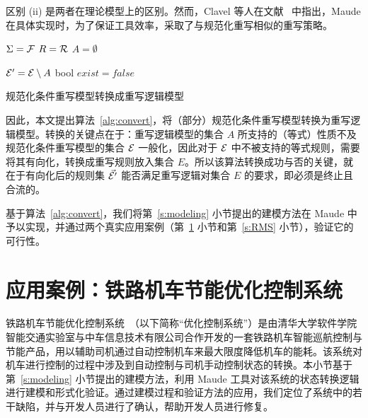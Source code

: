 区别 (ii) 是两者在理论模型上的区别。然而，Clavel 等人在文献~ 中指出，Maude 在具体实现时，为了保证工具效率，采取了与规范化重写相似的重写策略。

\begin{algorithm}[ht] 

    $\Sigma = \mathcal{F}$\;
    $R = \mathcal{R}$\;
    $A = \emptyset$\;


    $\mathcal{E}' = \mathcal{E} \setminus A$\;
    bool $exist = false$\;


     
\caption{规范化条件重写模型转换成重写逻辑模型}
\label{alg:convert}
\end{algorithm}

因此，本文提出算法~\ref{alg:convert}，将（部分）规范化条件重写模型转换为重写逻辑模型。转换的关键点在于：重写逻辑模型的集合 $A$ 所支持的（等式）性质不及规范化条件重写模型的集合 $\mathcal{E}$ 一般化，因此对于 $\mathcal{E}$ 中不被支持的等式规则，需要将其有向化，转换成重写规则放入集合 $E$。所以该算法转换成功与否的关键，就在于有向化后的规则集 $\vec{\mathcal{E}'}$ 能否满足重写逻辑对集合 $E$ 的要求，即必须是终止且合流的。

基于算法~\ref{alg:convert}，我们将第~\ref{s:modeling} 小节提出的建模方法在 Maude 中予以实现，并通过两个真实应用案例（第~\ref{s:TO} 小节和第~\ref{s:RMS} 小节），验证它的可行性。 



\section{应用案例：铁路机车节能优化控制系统}
\label{s:TO}

铁路机车节能优化控制系统~\cite{DBLP:journals/tc/HuangDYS16}（以下简称“优化控制系统”）是由清华大学软件学院智能交通实验室与中车信息技术有限公司合作开发的一套铁路机车智能巡航控制与节能产品，用以辅助司机通过自动控制机车来最大限度降低机车的能耗。该系统对机车进行控制的过程中涉及到自动控制与司机手动控制状态的转换。本小节基于第~\ref{s:modeling} 小节提出的建模方法，利用 Maude 工具对该系统的状态转换逻辑进行建模和形式化验证。通过建模过程和验证方法的应用，我们定位了系统中的若干缺陷，并与开发人员进行了确认，帮助开发人员进行修复。

